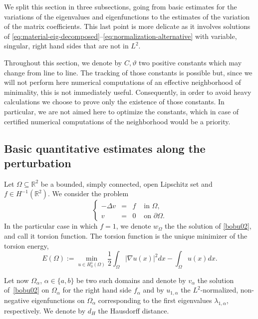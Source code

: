 \documentclass[JEP,XML,SOM,Unicode,ThmDefs,NoFloatCountersInSection,published]{cedram}
\theoremstyle{plain}
\theoremstyle{definition}
\newcommand{\thetathree}{\vartheta}
\def\R{\mathbb{R}}
\newcommand{\Om}{\Omega}
\newcommand{\lb}{\lambda}
\newcommand{\sq}{\subseteq}
\begin{document}
\smallskip
We split this section in three subsections, going from basic estimates for the variations of the eigenvalues and eigenfunctions to the estimates of the variation of the matrix coefficients. This last point is more delicate as it involves solutions of \eqref{eq:material-eig-decomposed}--\eqref{eq:normalization-alternative} with variable, singular, right hand sides that are not in $L^2$.

Throughout this section, we denote by $C, \thetathree$ two positive constants which may change from line to line.
The tracking of those constants is possible but, since we will not perform here numerical computations of an effective neighborhood of minimality, this is not immediately useful. Consequently, in order to avoid heavy calculations we choose to prove only the existence of those constants. In particular, we are not aimed here to optimize the constants, which in case of certified numerical computations of the neighborhood would be a priority.

\subsection{Basic quantitative estimates along the perturbation}
Let $\Om \sq \R^2$ be a bounded, simply connected, open Lipschitz set and $f \in H^{-1} (\R^2)$. We consider the problem\vspace*{-3pt}\enlargethispage{.5\baselineskip}
\begin{equation}\label{bobu02}
\left\{ \begin{array}{rcll}
-\Delta v & =& f & \text{ in }\Omega,\\
v &= &0 & \text{ on }\partial \Omega.
\end{array} \right.
\end{equation}
In the particular case in which $f=1$, we denote $w_{\Om}$ the the solution of \eqref{bobu02}, and call it torsion function. The torsion function is the unique minimizer of the torsion energy,\vspace*{-3pt}
\[
E(\Om):= \min_{u \in H^1_0(\Om)} \frac 12 \int_\Om |\nabla u(x) |^2 dx -\int_\Om u(x) dx.
\]

Let now $\Om_\alpha$, $\alpha\in \{a,b\}$ be two such domains and denote by $v_\alpha$ the solution of~\eqref{bobu02} on $\Om_\alpha $ for the right hand side $f_\alpha$ and by $u_{1,\alpha}$ the $L^2$-normalized, non-negative eigenfunctions on $\Om_\alpha$ corresponding to the first eigenvalues $\lb_{1,\alpha}$, respectively. We denote by $d_H$ the Hausdorff distance.
\end{document}
